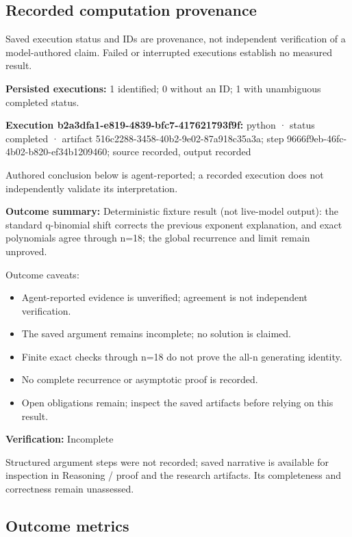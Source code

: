 \documentclass[11pt]{article}
\begin{document}
\subsection{Recorded computation provenance}
Saved execution status and IDs are provenance, not independent verification of a model-authored claim. Failed or interrupted executions establish no measured result.\par
\textbf{Persisted executions:} 1 identified; 0 without an ID; 1 with unambiguous completed status.\par
\textbf{Execution b2a3dfa1-e819-4839-bfc7-417621793f9f:} python · status completed · artifact 516c2288-3458-40b2-9e02-87a918c35a3a; step 9666f9eb-46fc-4b02-b820-ef34b1209460; source recorded, output recorded\par
Authored conclusion below is agent-reported; a recorded execution does not independently validate its interpretation.\par
\textbf{Outcome summary:} Deterministic fixture result (not live-model output): the standard q-binomial shift corrects the previous exponent explanation, and exact polynomials agree through n=18; the global recurrence and limit remain unproved.\par
Outcome caveats:\par
\begin{itemize}
\item Agent-reported evidence is unverified; agreement is not independent verification.
\item The saved argument remains incomplete; no solution is claimed.
\item Finite exact checks through n=18 do not prove the all-n generating identity.
\item No complete recurrence or asymptotic proof is recorded.
\item Open obligations remain; inspect the saved artifacts before relying on this result.
\end{itemize}
\textbf{Verification:} Incomplete\par
Structured argument steps were not recorded; saved narrative is available for inspection in Reasoning / proof and the research artifacts. Its completeness and correctness remain unassessed.\par
\subsection{Outcome metrics}
\end{document}
